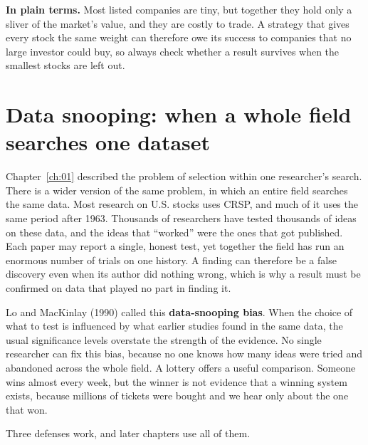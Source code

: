 \noindent\textbf{In plain terms.} Most listed companies are tiny, but together they hold only a sliver of the market's value, and they are costly to trade. A strategy that gives every stock the same weight can therefore owe its success to companies that no large investor could buy, so always check whether a result survives when the smallest stocks are left out.

\section{Data snooping: when a whole field searches one dataset}
\label{sec:02-snooping}

Chapter~\ref{ch:01} described the problem of selection within one researcher's search. There is a wider version of the same problem, in which an entire field searches the same data. Most research on U.S. stocks uses CRSP, and much of it uses the same period after 1963. Thousands of researchers have tested thousands of ideas on these data, and the ideas that ``worked'' were the ones that got published. Each paper may report a single, honest test, yet together the field has run an enormous number of trials on one history. A finding can therefore be a false discovery even when its author did nothing wrong, which is why a result must be confirmed on data that played no part in finding it.

Lo and MacKinlay (1990) called this \textbf{data-snooping bias}. When the choice of what to test is influenced by what earlier studies found in the same data, the usual significance levels overstate the strength of the evidence. No single researcher can fix this bias, because no one knows how many ideas were tried and abandoned across the whole field. A lottery offers a useful comparison. Someone wins almost every week, but the winner is not evidence that a winning system exists, because millions of tickets were bought and we hear only about the one that won.

Three defenses work, and later chapters use all of them.

